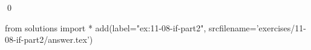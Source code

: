
\begin{ex}
  \label{ex:11-08-if-part2}
  
  \qed
\end{ex}
\begin{python0}
from solutions import *
add(label="ex:11-08-if-part2",
    srcfilename='exercises/11-08-if-part2/answer.tex')
\end{python0}
